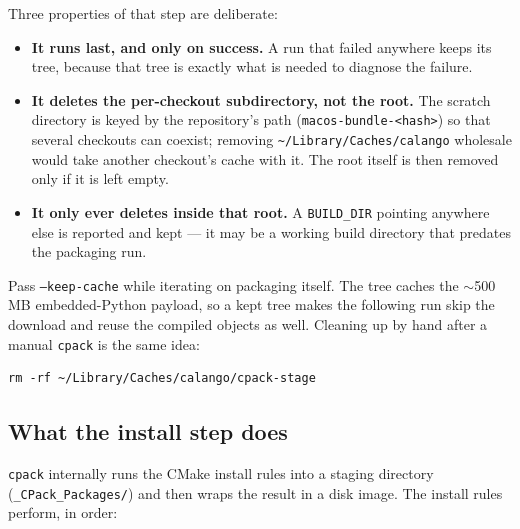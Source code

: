 \documentclass[11pt,a4paper]{article}
\newcommand{\file}[1]{\texttt{#1}}
\newcommand{\opt}[1]{\texttt{#1}}
\begin{document}
\noindent Three properties of that step are deliberate:

\begin{itemize}[itemsep=2pt]
  \item \textbf{It runs last, and only on success.} A run that failed
        anywhere keeps its tree, because that tree is exactly what is
        needed to diagnose the failure.
  \item \textbf{It deletes the per-checkout subdirectory, not the root.}
        The scratch directory is keyed by the repository's path
        (\file{macos-bundle-<hash>}) so that several checkouts can
        coexist; removing
        \file{\textasciitilde/Library/Caches/calango} wholesale would
        take another checkout's cache with it. The root itself is then
        removed only if it is left empty.
  \item \textbf{It only ever deletes inside that root.} A
        \opt{BUILD\_DIR} pointing anywhere else is reported and kept ---
        it may be a working build directory that predates the packaging
        run.
\end{itemize}

\noindent Pass \opt{--keep-cache} while iterating on packaging itself.
The tree caches the $\sim$500\,MB embedded-Python payload, so a kept tree
makes the following run skip the download and reuse the compiled objects
as well. Cleaning up by hand after a manual \opt{cpack} is the same idea:

\begin{lstlisting}
rm -rf ~/Library/Caches/calango/cpack-stage
\end{lstlisting}

\subsection{What the install step does}
\label{sec:install-step}

\opt{cpack} internally runs the CMake install rules into a staging
directory (\file{\_CPack\_Packages/}) and then wraps the result in a
disk image. The install rules perform, in order:
\end{document}
